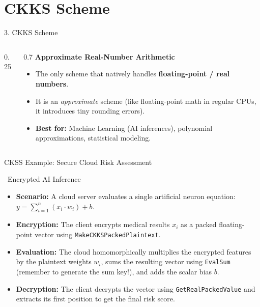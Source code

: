 \documentclass[aspectratio=169, 10pt]{beamer}
\begin{document}
\section{CKKS Scheme}
\begin{frame}{3. CKKS Scheme}
\begin{columns}[T]
\begin{column}{0.25\textwidth}
    \vspace{0.5cm}
    \centering
    \textcolor{DeepBlue}{\Huge \faBrain} \\ \vspace{0.3cm}
    \textcolor{AccentOrange}{\Large \faChartLine}
\end{column}
\begin{column}{0.7\textwidth}
    \Large \textbf{Approximate Real-Number Arithmetic} \\
    \normalsize \vspace{0.3cm}
    \begin{itemize}
        \item The only scheme that natively handles \textbf{floating-point / real numbers}.
        \item It is an \textit{approximate} scheme (like floating-point math in regular CPUs, it introduces tiny rounding errors).
        \item \textbf{Best for:} Machine Learning (AI inferences), polynomial approximations, statistical modeling.
    \end{itemize}
\end{column}
\end{columns}
\end{frame}

\begin{frame}{CKSS Example: Secure Cloud Risk Assessment}
\begin{block}{\faKeyboard \ Encrypted AI Inference}
\small
\vspace{0.1cm}
\begin{itemize}
\setlength{\itemsep}{0.05cm}
\item[\textbf{1.}] \textbf{Scenario:} A cloud server evaluates a single artificial neuron equation: $y = \sum_{i=1}^{n} (x_i \cdot w_i) + b$.
\item[\textbf{2.}] \textbf{Encryption:} The client encrypts medical results $x_i$ as a packed floating-point vector using \texttt{MakeCKKSPackedPlaintext}.
\item[\textbf{3.}] \textbf{Evaluation:} The cloud homomorphically multiplies the encrypted features by the plaintext weights $w_i$, sums the resulting vector using \texttt{EvalSum} (remember to generate the sum key!), and adds the scalar bias $b$.
\item[\textbf{4.}] \textbf{Decryption:} The client decrypts the vector using \texttt{GetRealPackedValue} and extracts its first position to get the final risk score.
\end{itemize}
\end{block}
\end{frame}
\end{document}
